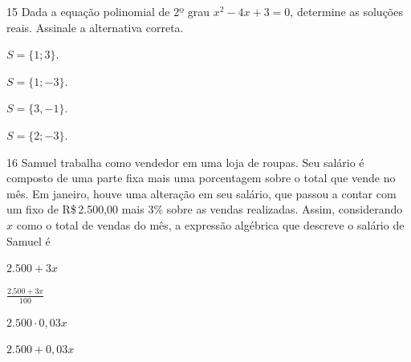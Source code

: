 
\pagebreak

\num{15} Dada a equação polinomial de 2º grau $x^2 - 4x + 3 = 0$, determine as
soluções reais. Assinale a alternativa correta.

\begin{escolha}
\item $S = \{1; 3\}$.
\item $S = \{1; -3\}$.
\item $S = \{3, -1\}$.
\item $S = \{2; -3\}$.
\end{escolha}








\num{16} Samuel trabalha como vendedor em uma loja de roupas. Seu salário é
composto de uma parte fixa mais uma porcentagem sobre o total que
vende no mês. Em janeiro, houve uma alteração em seu salário, que passou
a contar com um fixo de R\$\,2.500,00 mais 3\% sobre as vendas realizadas. Assim,
considerando $x$ como o total de vendas do mês, a expressão algébrica
que descreve o salário de Samuel é

\begin{escolha}
\item $2.500 + 3x$
\item $\frac{2.500 + 3x}{100}$
\item $2.500 \cdot 0,03x$
\item $2.500 + 0,03x$
\end{escolha}

